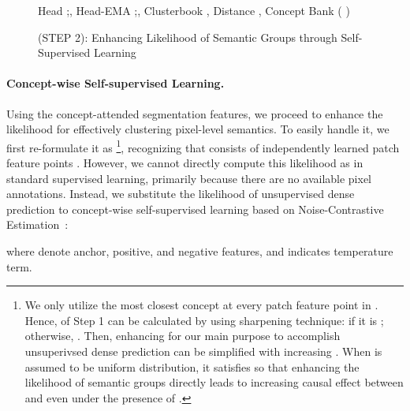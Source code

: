 \documentclass{article} \usepackage{iclr2024_conference,times}
\begin{document}
\begin{figure}[t!]
\vspace{-12mm}
\begin{algorithm}[H]
\caption{(STEP 2): Enhancing Likelihood of Semantic Groups through Self-Supervised Learning}
\begin{algorithmic}[1]
\Require Head ;, Head-EMA ;, Clusterbook , Distance , Concept Bank 
\For {}
\State  {}
\State  {}
\State  ({\large }  ) 
\State  {}
\State  {}
\State  {}
\State  {}
\State  {}
\State  {}
\EndFor
\end{algorithmic}
\label{alg:contrastive}
\end{algorithm}
\vspace{-7mm}
\end{figure} 
\paragraph{Concept-wise Self-supervised Learning.} 
Using the concept-attended segmentation features, we proceed to enhance the likelihood  for effectively clustering pixel-level semantics. To easily handle it, we first re-formulate it as \footnote{We only utilize the most closest concept at every patch feature point  in . Hence,  of Step 1 can be calculated by using sharpening technique:  if it is ; otherwise, . Then, enhancing  for our main purpose to accomplish unsuperivsed dense prediction can be simplified with increasing . When  is assumed to be uniform distribution, it satisfies  so that enhancing the likelihood of semantic groups  directly leads to increasing causal effect between  and  even under the presence of .}, recognizing that  consists of independently learned patch feature points . 
However, we cannot directly compute this likelihood as in standard supervised learning, primarily because there are no available pixel annotations. Instead, we substitute the likelihood of unsupervised dense prediction to concept-wise self-supervised learning based on Noise-Contrastive Estimation~\citep{gutmann2010noise}:

where  denote anchor, positive, and negative features, and  indicates temperature term.
\end{document}

